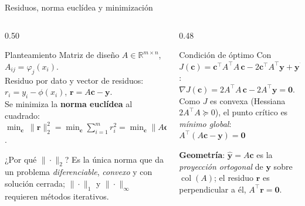 \documentclass[aspectratio=169,10pt]{beamer}
\begin{document}
\begin{frame}{Residuos, norma euclídea y minimización}
\begin{columns}[T]
\begin{column}{0.50\textwidth}
\begin{cardidea}{Planteamiento}{\faSuperscript}
{\footnotesize Matriz de diseño $A\in\mathbb R^{m\times n}$, $A_{ij}=\varphi_j(x_i)$.\\[0.8mm]
Residuo por dato y vector de residuos:\\[0.3mm]
$r_i=y_i-\phi(x_i)$, \quad $\mathbf r=A\mathbf c-\mathbf y$.\\[1.2mm]
Se minimiza la \textbf{norma euclídea} al cuadrado:\\[0.3mm]
$\displaystyle\min_{\mathbf c}\ \|\mathbf r\|_2^2=\min_{\mathbf c}\sum_{i=1}^m r_i^2=\min_{\mathbf c}\|A\mathbf c-\mathbf y\|_2^2$.}
\end{cardidea}
\vspace{1mm}
\begin{cardnota}[\faInfoCircle]
{\footnotesize ¿Por qué $\|\cdot\|_2$? Es la única norma que da un problema \emph{diferenciable}, \emph{convexo} y con solución cerrada; $\|\cdot\|_1$ y $\|\cdot\|_\infty$ requieren métodos iterativos.}
\end{cardnota}
\end{column}
\begin{column}{0.48\textwidth}
\begin{cardgear}{Condición de óptimo}{\faCogs}
{\footnotesize Con $J(\mathbf c)=\mathbf c^{\!\top}\!A^{\!\top}\!A\,\mathbf c-2\mathbf c^{\!\top}\!A^{\!\top}\mathbf y+\mathbf y^{\!\top}\mathbf y$:\\[0.6mm]
$\nabla J(\mathbf c)=2A^{\!\top}\!A\,\mathbf c-2A^{\!\top}\mathbf y=\mathbf 0$.\\[1.0mm]
Como $J$ es convexa (Hessiana $2A^{\!\top}\!A\succeq0$), el punto crítico es \emph{mínimo global}:\\[0.4mm]
$\boxed{A^{\!\top}(A\mathbf c-\mathbf y)=\mathbf 0}$}
\end{cardgear}
\vspace{1mm}
\begin{cardnota}[\faInfoCircle]
{\footnotesize \textbf{Geometría}: $\hat{\mathbf y}=A\mathbf c$ es la \emph{proyección ortogonal} de $\mathbf y$ sobre $\operatorname{col}(A)$; el residuo $\mathbf r$ es perpendicular a él, $A^{\!\top}\mathbf r=\mathbf 0$.}
\end{cardnota}
\end{column}
\end{columns}
\end{frame}
\end{document}
